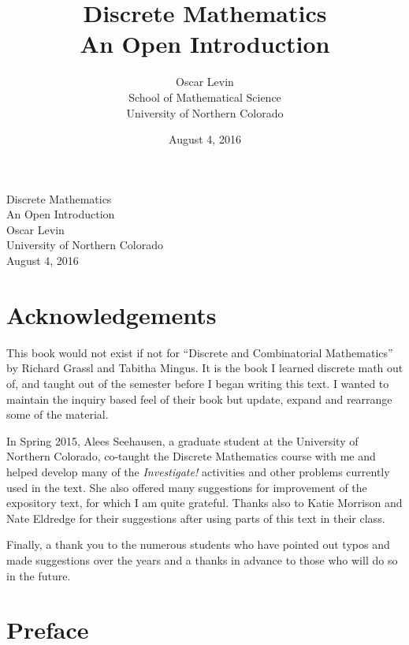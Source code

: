 \documentclass[10pt,]{book}
\title{Discrete Mathematics\\
{\large An Open Introduction}}
\author{Oscar Levin\\
School of Mathematical Science\\
University of Northern Colorado
}
\date{August 4, 2016}
\theoremstyle{plain}
\theoremstyle{definition}
\theoremstyle{definition}
\theoremstyle{definition}
\numberwithin{equation}{chapter}
\begin{document}
\frontmatter

\thispagestyle{empty}
{\centering
\vspace*{0.14\textheight}
{\Huge Discrete Mathematics}\\[\baselineskip]
{\LARGE An Open Introduction}\\[3\baselineskip]
{\Large Oscar Levin}\\[0.5\baselineskip]
{\Large University of Northern Colorado}\\[3\baselineskip]
{\Large August 4, 2016}\\}
\clearpage
\thispagestyle{empty}
\null\clearpage
\chapter*{Acknowledgements}\label{acknowledgement-1}

  This book would not exist if not for ``Discrete and Combinatorial Mathematics'' by Richard Grassl and Tabitha Mingus. It is the book I learned discrete math out of, and taught out of the semester before I began writing this text. I wanted to maintain the inquiry based feel of their book but update, expand and rearrange some of the material.
\par

  In Spring 2015, Alees Seehausen, a graduate student at the University of Northern Colorado, co-taught the Discrete Mathematics course with me and helped develop many of the \emph{Investigate!} activities and other problems currently used in the text. She also offered many suggestions for improvement of the expository text, for which I am quite grateful. Thanks also to Katie Morrison and Nate Eldredge for their suggestions after using parts of this text in their class.
\par

  Finally, a thank you to the numerous students who have pointed out typos and made suggestions over the years and a thanks in advance to those who will do so in the future.
\chapter*{Preface}\label{preface}
\end{document}
